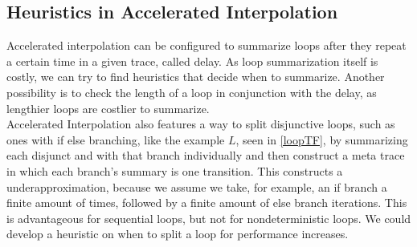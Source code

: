 \subsection{Heuristics in Accelerated Interpolation}
Accelerated interpolation can be configured to summarize loops after they repeat a certain time in a given trace, called delay. As loop summarization itself is costly, we can try to find heuristics that decide when to summarize. Another possibility is to check the length of a loop in conjunction with the delay, as lengthier loops are costlier to summarize. \\
Accelerated Interpolation also features a way to split disjunctive loops, such as ones with if else branching, like the example $L$, seen in \ref{loopTF}, by summarizing each disjunct and with that branch individually and then construct a meta trace in which each branch's summary is one transition. This constructs a underapproximation, because we assume we take, for example, an if branch a finite amount of times, followed by a finite amount of else branch iterations. This is advantageous for sequential loops, but not for nondeterministic loops. We could develop a heuristic on when to split a loop for performance increases. 

\begin{comment}
	To compute a loop summary from a \qvasrs, one has to calculate the reachability relation of the automaton. Haase and Halfon \cite{DBLP:conf/rp/HaaseH14} proposed a polytime procedure that computes a series of formulas from computed Parikh images that, as conjunction, form a summary of the system. This procedure can be adapted to work with \qvasrs
\end{comment}
